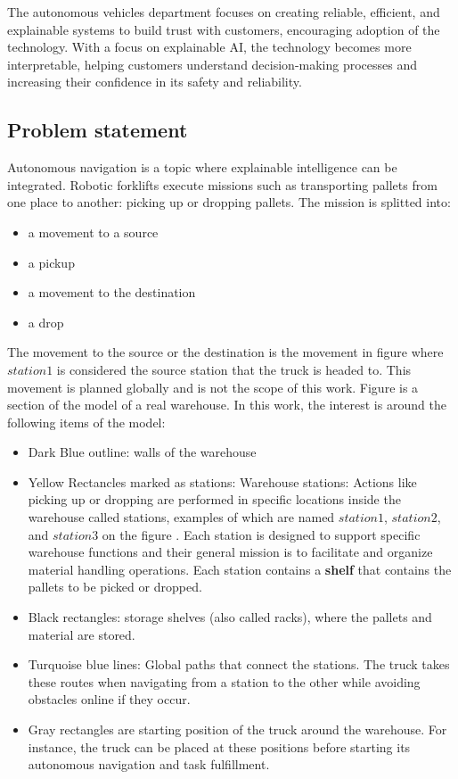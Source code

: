 The autonomous vehicles department focuses on creating reliable, efficient, and 
explainable systems to build trust with customers, encouraging adoption of the technology. 
With a focus on explainable AI, the technology becomes more interpretable, helping customers 
understand decision-making processes and increasing their confidence in its safety and reliability.

\newpage
\subsection{Problem statement}

Autonomous navigation is a topic where explainable intelligence can be integrated. 
Robotic forklifts execute missions such as transporting pallets from one place to another: 
picking up or dropping pallets.
The mission is splitted into:
\begin{itemize}
    \item a movement to a source
    \item a pickup
    \item a movement to the destination
    \item a drop
\end{itemize}
The movement to the source or the destination is the movement in figure  where \(station1\) 
is considered the source station that the truck is headed to.
This movement is planned globally and is not the scope of this work. 
Figure  is a section of the model of a real warehouse. In this work,
the interest is around the following items of the model:
\begin{itemize}
    \item Dark Blue outline: walls of the warehouse
    \item Yellow Rectancles marked as stations: Warehouse stations: Actions like picking up or 
    dropping are performed in specific locations inside the warehouse called 
    stations, examples of which are named \(station1\), \(station2\), and \(station3\) on the figure .
    Each station is designed to support specific warehouse functions and their general mission
    is to facilitate and organize material handling operations. 
    Each station contains a \textbf{shelf} that contains the pallets to be picked or dropped. 
    \item Black rectangles: storage shelves (also called racks), where the  pallets and material are 
    stored. 
    \item Turquoise blue lines: Global paths that connect the stations.
    The truck takes these routes when navigating from a station to the other while avoiding 
    obstacles online if they occur.
    \item Gray rectangles are starting position of the truck around the warehouse. For instance,
    the truck can be placed at these positions before starting its autonomous navigation and 
    task fulfillment.

\end{itemize}

